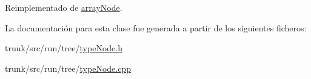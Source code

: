 Reimplementado de \hyperlink{classarrayNode_a5ead9863a0f9478798c7777a0c03b1a5}{array\-Node}.



La documentación para esta clase fue generada a partir de los siguientes ficheros\-:\begin{DoxyCompactItemize}
\item 
trunk/src/run/tree/\hyperlink{typeNode_8h}{type\-Node.\-h}\item 
trunk/src/run/tree/\hyperlink{typeNode_8cpp}{type\-Node.\-cpp}\end{DoxyCompactItemize}
